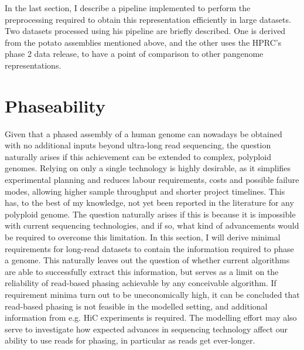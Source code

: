 In the last section, I describe a pipeline implemented to perform the preprocessing required to obtain this representation efficiently in large datasets.
Two datasets processed using his pipeline are briefly described.
One is derived from the potato assemblies mentioned above, and the other uses the HPRC's phase 2 data release, to have a point of comparison to other pangenome representations\cite{sun25, hprc2}.



\section*{Phaseability}



Given that a phased assembly of a human genome can nowadays be obtained with no additional inputs beyond ultra-long read sequencing\cite{cheng24, gross26}, the question naturally arises if this achievement can be extended to complex, polyploid genomes.
Relying on only a single technology is highly desirable, as it simplifies experimental planning and reduces labour requirements, costs and possible failure modes, allowing higher sample throughput and shorter project timelines.
This has, to the best of my knowledge, not yet been reported in the literature for any polyploid genome.
The question naturally arises if this is because it is impossible with current sequencing technologies, and if so, what kind of advancements would be required to overcome this limitation.
In this section, I will derive minimal requirements for long-read datasets to contain the information required to phase a genome. %
This naturally leaves out the question of whether current algorithms are able to successfully extract this information, but serves as a limit on the reliability of read-based phasing achievable by any conceivable algorithm. 
If requirement minima turn out to be uneconomically high, it can be concluded that read-based phasing is not feasible in the modelled setting, and additional information from e.g. HiC experiments is required.
The modelling effort may also serve to investigate how expected advances in sequencing technology affect our ability to use reads for phasing, in particular as reads get ever-longer.

